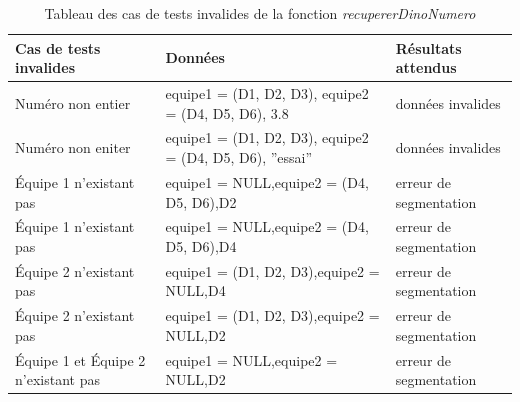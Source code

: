 \documentclass[11pt,a4paper]{article}
\begin{document}
\begin{table}[H]
    \centering
    \small
    \begin{tabularx}{\textwidth}{|
    >{\centering\arraybackslash}p{3.2cm}|
    >{\arraybackslash}X|
    >{\centering\arraybackslash}p{4cm}|} \hline
        \textbf{Cas de tests invalides} & \centering\textbf{Données} & \textbf{Résultats attendus} \\ \hline
        Numéro non entier & equipe1 = (D1, D2, D3), equipe2 = (D4, D5, D6), 3.8 & données invalides \\ \hline
        Numéro non eniter & equipe1 = (D1, D2, D3), equipe2 = (D4, D5, D6), ''essai'' & données invalides \\ \hline
        Équipe 1 n'existant pas & equipe1 = NULL,\newline equipe2 = (D4, D5, D6),\newline D2 & erreur de segmentation \\ \hline
        Équipe 1 n'existant pas & equipe1 = NULL,\newline equipe2 = (D4, D5, D6),\newline D4 & erreur de segmentation \\ \hline
        Équipe 2 n'existant pas & equipe1 = (D1, D2, D3),\newline equipe2 = NULL,\newline D4 & erreur de segmentation \\ \hline
        Équipe 2 n'existant pas & equipe1 = (D1, D2, D3),\newline equipe2 = NULL,\newline D2 & erreur de segmentation \\ \hline
        Équipe 1 et  Équipe 2  n'existant pas & equipe1 = NULL,\newline equipe2 = NULL,\newline D2 & erreur de segmentation \\ \hline
    \end{tabularx}
    \caption{Tableau des cas de tests invalides de la fonction \textit{\mbox{recupererDinoNumero}}}
    \label{tab_cas_invalides_ recupererDinoNumero}
\end{table}
\end{document}
